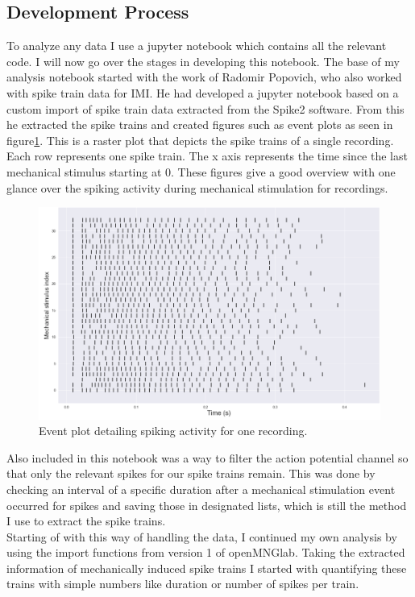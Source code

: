 \subsection{Development Process}
To analyze any data I use a jupyter notebook which contains all the relevant code. I will now go over the stages in developing this notebook.
The base of my analysis notebook started with the work of Radomir Popovich, who also worked with spike train data for IMI. He had developed a jupyter notebook based on a custom import of spike train data extracted from the Spike2 software. From this he extracted the spike trains and created figures such as event plots as seen in figure\ref{fig:eventplot}. This is a raster plot that depicts the spike trains of a single recording. Each row represents one spike train. The x axis represents the time since the last mechanical stimulus starting at 0. These figures give a good overview with one glance over the spiking activity during mechanical stimulation for recordings.
\begin{figure}
	\includegraphics[width = \textwidth]{src/pic/event_plot}
	\caption{Event plot detailing spiking activity for one recording.}
	\label{fig:eventplot}
\end{figure}
Also included in this notebook was a way to filter the action potential channel so that only the relevant spikes for our spike trains remain. This was done by checking an interval of a specific duration after a mechanical stimulation event occurred for spikes and saving those in designated lists, which is still the method I use to extract the spike trains.\\
Starting of with this way of handling the data, I continued my own analysis by using the import functions from version 1 of openMNGlab. Taking the extracted information of mechanically induced spike trains I started with quantifying these trains with simple numbers like duration or number of spikes per train.\\
